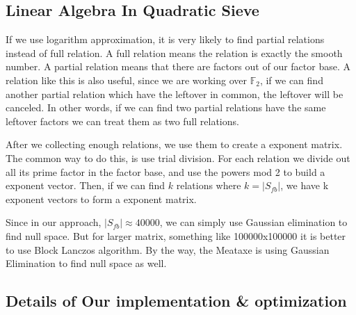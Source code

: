 \documentclass[12pt]{article} %
\begin{document}
\subsection {Linear Algebra In Quadratic Sieve}

If we use logarithm approximation, it is very likely to find partial relations instead of full relation. A full relation means the relation is exactly the smooth number. A partial relation means that there are factors out of our factor base. A relation like this is also useful, since we are working over $\mathbb{F}_2$, if we can find another partial relation which have the leftover in common, the leftover will be canceled. In other words, if we can find two partial relations have the same leftover factors we can treat them as two full relations.

After we collecting enough relations, we use them to create a exponent matrix. The common way to do this, is use trial division. For each relation we divide out all its  prime factor in the factor base, and use the powers mod 2 to build a exponent vector. 
Then, if we can find $k$ relations where $k = |S_{fb}|$, we have k exponent vectors to form a exponent matrix. 

Since in our approach, $|S_{fb}|\approx 40000$, we can simply use Gaussian elimination to find null space. But for larger matrix, something like 100000x100000 it is better to use Block Lanczos algorithm. By the way, the Meataxe is using Gaussian Elimination to find null space as well.

\subsection {Details of Our implementation \& optimization}
\end{document}

